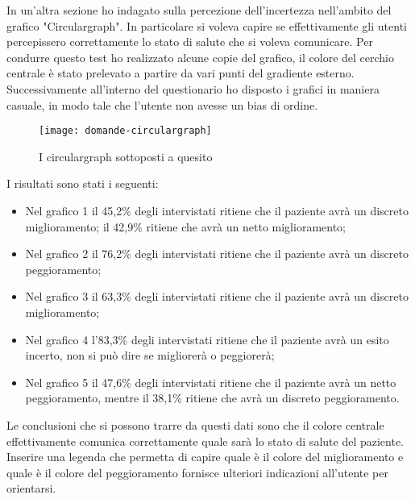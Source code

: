 In un'altra sezione ho indagato sulla percezione dell'incertezza nell'ambito del grafico "Circulargraph". In particolare si voleva capire se effettivamente gli utenti percepissero correttamente lo stato di salute che si voleva comunicare. Per condurre questo test ho realizzato alcune copie del grafico, il colore del cerchio centrale è stato prelevato a partire da vari punti del gradiente esterno. Successivamente all'interno del questionario ho disposto i grafici in maniera casuale, in modo tale che l'utente non avesse un bias di ordine. \\

\begin{figure}[!ht] 
    \centering 
    \texttt{[image: domande-circulargraph]}
    \caption{I circulargraph sottoposti a quesito}
\end{figure}

I risultati sono stati i seguenti:
\begin{itemize}
    \item Nel grafico 1 il 45,2\% degli intervistati ritiene che il paziente avrà un discreto miglioramento; il 42,9\% ritiene che avrà un netto miglioramento;
    \item Nel grafico 2 il 76,2\% degli intervistati ritiene che il paziente avrà un discreto peggioramento;
    \item Nel grafico 3 il 63,3\% degli intervistati ritiene che il paziente avrà un discreto miglioramento;
    \item Nel grafico 4 l'83,3\% degli intervistati ritiene che il paziente avrà un esito incerto, non si può dire se migliorerà o peggiorerà;
    \item Nel grafico 5 il 47,6\% degli intervistati ritiene che il paziente avrà un netto peggioramento, mentre il 38,1\% ritiene che avrà un discreto peggioramento.
\end{itemize}
Le conclusioni che si possono trarre da questi dati sono che il colore centrale effettivamente comunica correttamente quale sarà lo stato di salute del paziente. Inserire una legenda che permetta di capire quale è il colore del miglioramento e quale è il colore del peggioramento fornisce ulteriori indicazioni all'utente per orientarsi. \\

